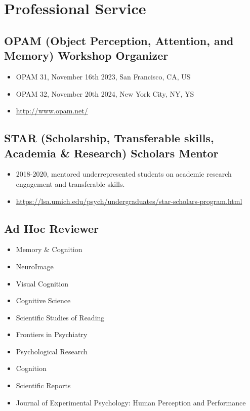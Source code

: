 \documentclass[11pt,a4paper,]{awesome-cv}
\providecommand{\tightlist}{%
	\setlength{\itemsep}{0pt}\setlength{\parskip}{0pt}}
\begin{document}
\hypertarget{professional-service}{%
\section{Professional Service}\label{professional-service}}

\hypertarget{opam-object-perception-attention-and-memory-workshop-organizer}{%
\subsection{OPAM (Object Perception, Attention, and Memory) Workshop
Organizer}\label{opam-object-perception-attention-and-memory-workshop-organizer}}

\begin{itemize}
\tightlist
\item
  OPAM 31, November 16th 2023, San Francisco, CA, US
\item
  OPAM 32, November 20th 2024, New York City, NY, YS
\item
  \url{http://www.opam.net/}
\end{itemize}

\hypertarget{star-scholarship-transferable-skills-academia-research-scholars-mentor}{%
\subsection{STAR (Scholarship, Transferable skills, Academia \&
Research) Scholars
Mentor}\label{star-scholarship-transferable-skills-academia-research-scholars-mentor}}

\begin{itemize}
\tightlist
\item
  2018-2020, mentored underrepresented students on academic research
  engagement and transferable skills.
\item
  \url{https://lsa.umich.edu/psych/undergraduates/star-scholars-program.html}
\end{itemize}

\hypertarget{ad-hoc-reviewer}{%
\subsection{Ad Hoc Reviewer}\label{ad-hoc-reviewer}}

\begin{itemize}
\tightlist
\item
  Memory \& Cognition
\item
  NeuroImage
\item
  Visual Cognition
\item
  Cognitive Science
\item
  Scientific Studies of Reading
\item
  Frontiers in Psychiatry
\item
  Psychological Research
\item
  Cognition
\item
  Scientific Reports
\item
  Journal of Experimental Psychology: Human Perception and Performance
\end{itemize}
\end{document}
